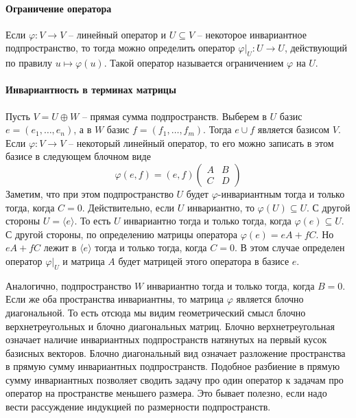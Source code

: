 \paragraph{Ограничение оператора} 

Если $\varphi \colon V\to V$ -- линейный оператор и $U\subseteq V$ -- некоторое инвариантное подпространство, то тогда можно определить оператор $\varphi|_U\colon U\to U$, действующий по правилу $u\mapsto \varphi(u)$. Такой оператор называется ограничением $\varphi$ на $U$.

\paragraph{Инвариантность в терминах матрицы}


Пусть $V = U \oplus W$ -- прямая сумма подпространств. Выберем в $U$ базис $e=(e_1,\ldots,e_n)$, а в $W$ базис $f = (f_1,\ldots,f_m)$. Тогда $e \cup f$ является базисом $V$. Если $\varphi \colon V \to V$ -- некоторый линейный оператор, то его можно записать в этом базисе в следующем блочном виде
\[
\varphi (e, f) = (e, f)
\begin{pmatrix}
{A}&{B}\\
{C}&{D}
\end{pmatrix}
\]
Заметим, что при этом подпространство $U$ будет $\varphi$-инвариантным тогда и только тогда, когда $C = 0$. Действительно, если $U$ инвариантно, то $\varphi(U)\subseteq U$. С другой стороны $U = \langle e \rangle$. То есть $U$ инвариантно тогда и только тогда, когда $\varphi(e) \subseteq U$. С другой стороны, по определению матрицы оператора $\varphi (e) = eA + fC$. Но $eA + fC$ лежит в $\langle e\rangle$ тогда и только тогда, когда $C = 0$. В этом случае определен оператор $\varphi|_U$ и матрица $A$ будет матрицей этого оператора в базисе $e$.

Аналогично, подпространство $W$ инвариантно тогда и только тогда, когда $B = 0$. Если же оба пространства инвариантны, то матрица $\varphi$ является блочно диагональной. То есть отсюда мы видим геометрический смысл блочно верхнетреугольных и блочно диагональных матриц. Блочно верхнетреугольная означает наличие инвариантных подпространств натянутых на первый кусок базисных векторов. Блочно диагональный вид означает разложение пространства в прямую сумму инвариантных подпространств. Подобное разбиение в прямую сумму инвариантных позволяет сводить задачу про один оператор к задачам про оператор на пространстве меньшего размера. Это бывает полезно, если надо вести рассуждение индукцией по размерности подпространств.


